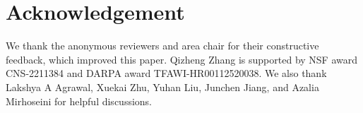 \section*{Acknowledgement}

We thank the anonymous reviewers and area chair for their constructive feedback, which improved this paper.
Qizheng Zhang is supported by NSF award CNS-2211384 and DARPA award TFAWI-HR00112520038.
We also thank Lakshya A Agrawal, Xuekai Zhu, Yuhan Liu, Junchen Jiang, and Azalia Mirhoseini for helpful discussions.